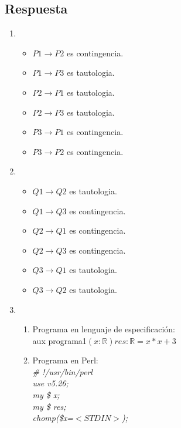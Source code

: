 \documentclass[a4paper]{article}
\begin{document}
\subsection*{Respuesta}
	\begin{enumerate}[label=\alph*)]
		\item \begin{itemize}[label=$\cdot$]
			\item $P1\rightarrow  P2$ es contingencia.
			\item $P1\rightarrow  P3$ es tautologia.
			\item $P2\rightarrow  P1$ es tautologia.
			\item $P2\rightarrow  P3$ es tautologia.
			\item $P3\rightarrow  P1$ es contingencia.
			\item $P3\rightarrow  P2$ es contingencia.
		\end{itemize}	
		\item \begin{itemize}[label=$\cdot$]
			\item $Q1\rightarrow  Q2$ es tautologia.
			\item $Q1\rightarrow  Q3$ es contingencia.
			\item $Q2\rightarrow  Q1$ es contingencia.
			\item $Q2\rightarrow  Q3$ es contingencia.
			\item $Q3\rightarrow  Q1$ es tautologia.
			\item $Q3\rightarrow  Q2$ es tautologia.
		\end{itemize}
		\item \begin{enumerate}[label=\arabic*)]
			\item Programa en lenguaje de especificación:\smallskip \\
				\hspace*{10mm}aux programa1$(x:\mathbb{R})res: \mathbb{R}=x*x+3$
			\item Programa en Perl: \smallskip \\
				\textit{\hspace*{10mm}\# !/usr/bin/perl\\
				\hspace*{10mm}use v5.26;\\
				\hspace*{10mm}my \$ x;\\
				\hspace*{10mm}my \$ res;\\
				\hspace*{10mm}chomp(\$x=$<STDIN>$);\\
}
\end{enumerate}
\end{enumerate}
\end{document}
